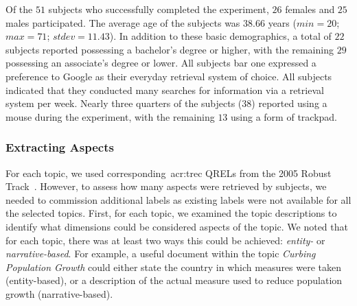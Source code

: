 Of the $51$ subjects who successfully completed the experiment, $26$ females and $25$ males participated. The average age of the subjects was $38.66$ years ($min=20$; $max=71$; $stdev=11.43$). In addition to these basic demographics, a total of $22$ subjects reported possessing a bachelor's degree or higher, with the remaining $29$ possessing an associate's degree or lower. All subjects bar one expressed a preference to Google as their everyday retrieval system of choice. All subjects indicated that they conducted many searches for information via a retrieval system per week. Nearly three quarters of the subjects ($38$) reported using a mouse during the experiment, with the remaining $13$ using a form of trackpad.

\subsubsection{Extracting Aspects}\label{sec:diversity:users:method:aspects}
For each topic, we used corresponding~\gls{acr:trec} QRELs from the 2005 Robust Track~\citep{voorhees2006trec_robust}. However, to assess how many aspects were retrieved by subjects, we needed to commission additional labels as existing labels were not available for all the selected topics. First, for each topic, we examined the topic descriptions to identify what dimensions could be considered aspects of the topic. We noted that for each topic, there was at least two ways this could be achieved: \emph{entity-} or \emph{narrative-based}. For example, a useful document within the topic \emph{Curbing Population Growth} could either state the country in which measures were taken (entity-based), or a description of the actual measure used to reduce population growth (narrative-based).

